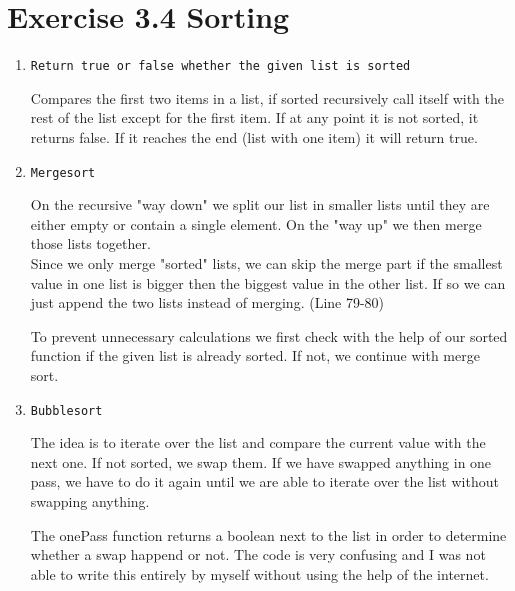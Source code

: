 \documentclass{article} %
\newcommand{\homeworkNumber}{3} %
\begin{document}
\clearpage

\section*{Exercise \homeworkNumber.4 Sorting}

\begin{enumerate}
\item \verb|Return true or false whether the given list is sorted|\\
\lstset{language=Haskell}


Compares the first two items in a list, if sorted recursively call itself with the rest of the list except for the first item. If at any point it is not sorted, it returns false. If it reaches the end (list with one item) it will return true.\\

\item \verb|Mergesort|\\
\lstset{language=Haskell}


On the recursive "way down" we split our list in smaller lists until they are either empty or contain a single element. On the "way up" we then merge those lists together.\\

Since we only merge "sorted" lists, we can skip the merge part if the smallest value in one list is bigger then the biggest value in the other list. If so we can just append the two lists instead of merging. (Line 79-80)

To prevent unnecessary calculations we first check with the help of our sorted function if the given list is already sorted. If not, we continue with merge sort.

\clearpage

\item \verb|Bubblesort|\\
\lstset{language=Haskell}


The idea is to iterate over the list and compare the current value with the next one. If not sorted, we swap them. If we have swapped anything in one pass, we have to do it again until we are able to iterate over the list without swapping anything.

The onePass function returns a boolean next to the list in order to determine whether a swap happend or not. The code is very confusing and I was not able to write this entirely by myself without using the help of the internet.


\end{enumerate}
\clearpage
\end{document}
